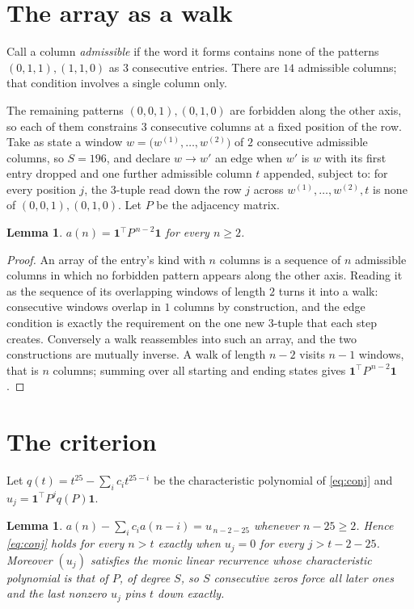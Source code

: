 \documentclass[11pt,a4paper]{article}
\theoremstyle{plain}
\newtheorem{lemma}[theorem]{Lemma}
\theoremstyle{definition}
\begin{document}
\section{The array as a walk}

Call a column \emph{admissible} if the word it forms contains none of the patterns
$(0,1,1), (1,1,0)$ as $3$ consecutive entries. There are $14$ admissible columns; that condition
involves a single column only.

The remaining patterns $(0,0,1), (0,1,0)$ are forbidden along the other axis, so each of them
constrains $3$ consecutive columns at a fixed position of the row. Take as state a
window $w=\bigl(w^{(1)},\dots,w^{(2)}\bigr)$ of $2$ consecutive admissible
columns, so $S=196$, and declare $w\to w'$ an edge when $w'$ is $w$ with its first entry
dropped and one further admissible column $t$ appended, subject to: for every position
$j$, the $3$-tuple read down the row $j$ across $w^{(1)},\dots,w^{(2)},t$
is none of $(0,0,1), (0,1,0)$. Let $P$ be the adjacency matrix.

\begin{lemma}\label{lem:walk}
$a(n)=\mathbf{1}^{\!\top}P^{\,n-2}\mathbf{1}$ for every $n\ge2$.
\end{lemma}

\begin{proof}
An array of the entry's kind with $n$ columns is a sequence of $n$ admissible columns in
which no forbidden pattern appears along the other axis. Reading it as the sequence of its
overlapping windows of length $2$ turns it into a walk: consecutive windows overlap in
$1$ columns by construction, and the edge condition is exactly the requirement on the one
new $3$-tuple that each step creates. Conversely a walk reassembles into such an array,
and the two constructions are mutually inverse. A walk of length $n-2$ visits $n-1$
windows, that is $n$ columns; summing over all starting and ending states gives
$\mathbf{1}^{\!\top}P^{\,n-2}\mathbf{1}$.
\end{proof}

\section{The criterion}

Let $q(t)=t^{25}-\sum_i c_i t^{25-i}$ be the characteristic polynomial of
\eqref{eq:conj} and $u_j=\mathbf{1}^{\!\top}P^{j}q(P)\mathbf{1}$.

\begin{lemma}\label{lem:crit}
$a(n)-\sum_i c_i a(n-i)=u_{\,n-2-25}$ whenever $n-25\ge2$. Hence
\eqref{eq:conj} holds for every $n>t$ exactly when $u_j=0$ for every
$j>t-2-25$. Moreover $(u_j)$ satisfies the monic linear recurrence whose
characteristic polynomial is that of $P$, of degree $S$, so $S$ consecutive zeros force all
later ones and the last nonzero $u_j$ pins $t$ down exactly.
\end{lemma}
\end{document}
